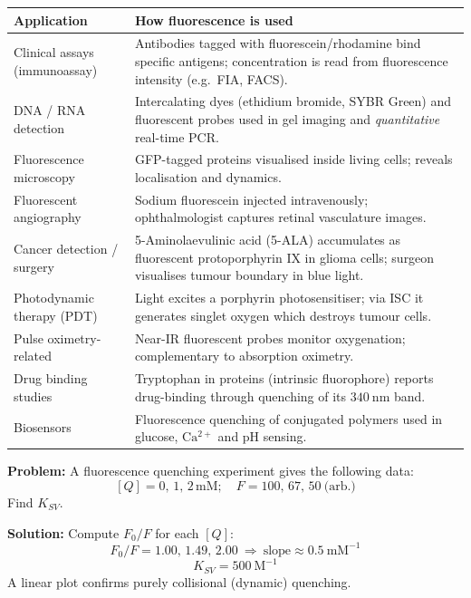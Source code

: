 \documentclass[12pt,a4paper]{article}
\begin{document}
\begin{tabularx}{\linewidth}{|B{3.4cm}|Y|}
\hline
\textbf{Application} & \textbf{How fluorescence is used} \\
\hline
Clinical assays (immunoassay) & Antibodies tagged with fluorescein/rhodamine bind specific antigens; concentration is read from fluorescence intensity (e.g.\ FIA, FACS). \\
\hline
DNA / RNA detection & Intercalating dyes (ethidium bromide, SYBR Green) and fluorescent probes used in gel imaging and \emph{quantitative} real-time PCR. \\
\hline
Fluorescence microscopy & GFP-tagged proteins visualised inside living cells; reveals localisation and dynamics. \\
\hline
Fluorescent angiography & Sodium fluorescein injected intravenously; ophthalmologist captures retinal vasculature images. \\
\hline
Cancer detection / surgery & 5-Aminolaevulinic acid (5-ALA) accumulates as fluorescent protoporphyrin IX in glioma cells; surgeon visualises tumour boundary in blue light. \\
\hline
Photodynamic therapy (PDT) & Light excites a porphyrin photosensitiser; via ISC it generates singlet oxygen which destroys tumour cells. \\
\hline
Pulse oximetry-related & Near-IR fluorescent probes monitor oxygenation; complementary to absorption oximetry. \\
\hline
Drug binding studies & Tryptophan in proteins (intrinsic fluorophore) reports drug-binding through quenching of its $340\ \mathrm{nm}$ band. \\
\hline
Biosensors & Fluorescence quenching of conjugated polymers used in glucose, $\mathrm{Ca^{2+}}$ and pH sensing. \\
\hline
\end{tabularx}

\begin{tcolorbox}[examplebox, title={Solved Example: Stern--Volmer Plot Reading}]
\textbf{Problem:} A fluorescence quenching experiment gives the following data:
\[
[Q] = 0,\,1,\,2\,\mathrm{mM};\quad F = 100,\,67,\,50\ \text{(arb.)}
\]
Find $K_{SV}$.

\textbf{Solution:} Compute $F_0/F$ for each $[Q]$:
\[
F_0/F = 1.00,\,1.49,\,2.00 \ \Rightarrow\ \text{slope}\approx 0.5\ \mathrm{mM^{-1}}
\]
\[
K_{SV}=500\ \mathrm{M^{-1}}
\]
A linear plot confirms purely collisional (dynamic) quenching.
\end{tcolorbox}
\end{document}
